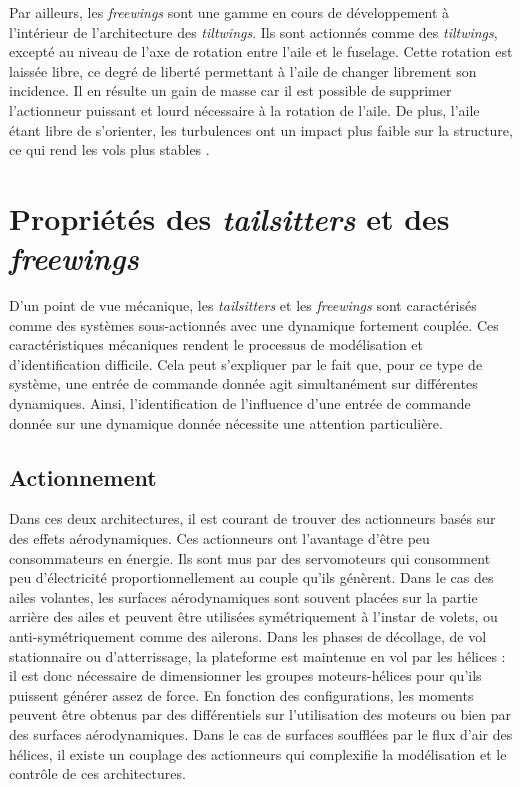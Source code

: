         Par ailleurs, les \textit{freewings} sont une gamme en cours de développement à l'intérieur de l'architecture des \textit{tiltwings}. Ils sont actionnés comme des \textit{tiltwings}, excepté au niveau de l'axe de rotation entre l'aile et le fuselage. Cette rotation est laissée libre, ce degré de liberté permettant à l'aile de changer librement son incidence. Il en résulte un gain de masse car il est possible de supprimer l'actionneur puissant et lourd nécessaire à la rotation de l'aile. De plus, l'aile étant libre de s'orienter, les turbulences ont un impact plus faible sur la structure, ce qui rend les vols plus stables \cite{freewing2012, Johnson2021, Johnson2023}. 


\section{Propriétés des \textit{tailsitters} et des \textit{freewings}}
    D'un point de vue mécanique, les \textit{tailsitters} et les \textit{freewings} sont caractérisés comme des systèmes sous-actionnés avec une dynamique fortement couplée. Ces caractéristiques mécaniques rendent le processus de modélisation et d'identification difficile. Cela peut s'expliquer par le fait que, pour ce type de système, une entrée de commande donnée agit simultanément sur différentes dynamiques. Ainsi, l'identification de l'influence d'une entrée de commande donnée sur une dynamique donnée nécessite une attention particulière.
    \subsection{Actionnement}
    Dans ces deux architectures, il est courant de trouver des actionneurs basés sur des effets aérodynamiques. Ces actionneurs ont l'avantage d'être peu consommateurs en énergie. Ils sont mus par des servomoteurs qui consomment peu d'électricité proportionnellement au couple qu'ils génèrent. Dans le cas des ailes volantes, les surfaces aérodynamiques sont souvent placées sur la partie arrière des ailes et peuvent être utilisées symétriquement à l'instar de volets, ou anti-symétriquement comme des ailerons. 
    Dans les phases de décollage, de vol stationnaire ou d'atterrissage, la plateforme est maintenue en vol par les hélices : il est donc nécessaire de dimensionner les groupes moteurs-hélices pour qu'ils puissent générer assez de force. En fonction des configurations, les moments peuvent être obtenus par des différentiels sur l'utilisation des moteurs ou bien par des surfaces aérodynamiques. Dans le cas de surfaces soufflées par le flux d'air des hélices, il existe un couplage des actionneurs qui complexifie la modélisation et le contrôle de ces architectures.


